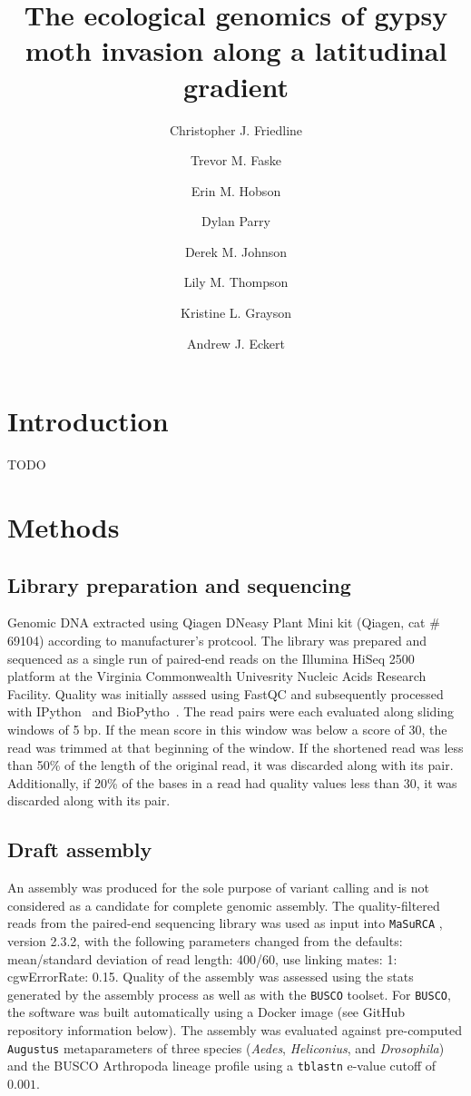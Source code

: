 \documentclass[fleqn,11pt]{wlpeerj}
\title{The ecological genomics of gypsy moth invasion along a latitudinal
gradient}
\author[1]{Christopher J. Friedline}
\author[1]{Trevor M. Faske}
\author[1]{Erin M. Hobson}
\author[2]{Dylan Parry}
\author[1]{Derek M. Johnson}
\author[3]{Lily M. Thompson}
\author[3,*]{Kristine L. Grayson}
\author[1,*,\textdagger]{Andrew J. Eckert}
\affil[1]{Department of Biology, Virginia Commonwealth University}
\affil[2]{College of Environmental Science and Forestry, State University of
New York}
\affil[3]{Department of Biology, University of Richmond}
\affil[*]{Author contributed equally}
\affil[ \textdagger]{Corresponding author}
\begin{document}
\flushbottom
\maketitle
\thispagestyle{empty}

\linenumbers%

\section*{Introduction}
TODO


\section*{Methods}

\subsection*{Library preparation and sequencing}

Genomic DNA extracted using Qiagen DNeasy Plant Mini kit (Qiagen, cat \# 69104)
according to manufacturer's protcool.  The library was prepared and sequenced as
a single run of paired-end reads on the Illumina HiSeq 2500 platform at the
Virginia Commonwealth Univesrity Nucleic Acids Research Facility. Quality was
initially asssed using FastQC \citep{fastqc} and subsequently processed with
IPython~\cite{Perez:2007hy} and BioPytho~\cite{Cock:2009hj}. The read pairs
were each evaluated along sliding windows of 5 bp.  If the mean score in this
window was below a score of 30, the read was trimmed at that beginning of the
window. If the shortened read was less than 50\% of the length of the original
read, it was discarded along with its pair. Additionally, if 20\% of the bases
in a read had quality values less than 30, it was discarded along with its pair.

\subsection*{Draft assembly}

An assembly was produced for the sole purpose of variant calling and is not
considered as a candidate for complete genomic assembly. The quality-filtered
reads from the paired-end sequencing library was used as input into
\texttt{MaSuRCA} \citep{Zimin:2013kn}, version 2.3.2, with the following
parameters changed from the defaults: mean/standard deviation of read length:
400/60, use linking mates: 1: cgwErrorRate: 0.15.  Quality of the assembly was
assessed using the stats generated by the assembly process as well as with the
\texttt{BUSCO} \citep{Simao:2015kk} toolset. For \texttt{BUSCO}, the software
was built automatically using a Docker image (see GitHub repository information
below). The assembly was evaluated against pre-computed \texttt{Augustus}
\citep{Stanke:2003eo} metaparameters of  three species (\textit{Aedes},
\textit{Heliconius}, and \textit{Drosophila}) and the BUSCO Arthropoda lineage
profile using a \texttt{tblastn} e-value cutoff of $0.001$.
\end{document}
